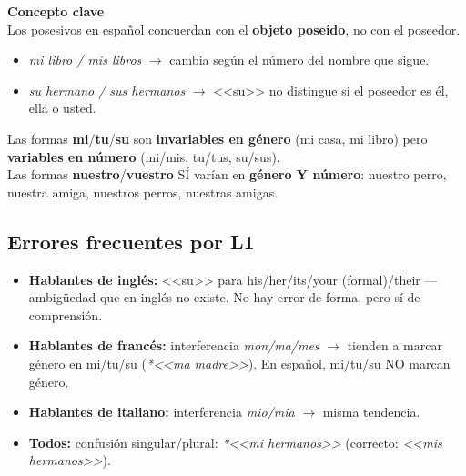 \documentclass[a4paper,10pt]{article}
\newcommand{\pos}[1]{\textbf{\textcolor{purpura}{#1}}}
\begin{document}
\begin{conceptbox}
\textbf{\textcolor{purpura}{\large Concepto clave}}\\[0.3cm]
Los posesivos en espa\~{n}ol concuerdan con el \textbf{objeto pose\'ido}, no con el poseedor.
\begin{itemize}[nosep, leftmargin=1.5em]
\item \textit{mi libro / mis libros} $\rightarrow$ cambia seg\'un el n\'umero del nombre que sigue.
\item \textit{su hermano / sus hermanos} $\rightarrow$ <<su>> no distingue si el poseedor es \'el, ella o usted.
\end{itemize}
\vspace{0.2cm}
Las formas \pos{mi}/\pos{tu}/\pos{su} son \textbf{invariables en g\'enero} (mi casa, mi libro) pero \textbf{variables en n\'umero} (mi/mis, tu/tus, su/sus).\\[0.2cm]
Las formas \pos{nuestro}/\pos{vuestro} S\'I var\'ian en \textbf{g\'enero Y n\'umero}: nuestro perro, nuestra amiga, nuestros perros, nuestras amigas.
\end{conceptbox}

\vspace{0.5cm}


\subsection*{\textcolor{purpura}{Errores frecuentes por L1}}

\begin{itemize}[leftmargin=1.5em]
\item \textbf{Hablantes de ingl\'es:} <<su>> para his/her/its/your (formal)/their --- ambig\"uedad que en ingl\'es no existe. No hay error de forma, pero s\'i de comprensi\'on.
\item \textbf{Hablantes de franc\'es:} interferencia \textit{mon/ma/mes} $\rightarrow$ tienden a marcar g\'enero en mi/tu/su (\textit{*<<ma madre>>}). En espa\~{n}ol, mi/tu/su NO marcan g\'enero.
\item \textbf{Hablantes de italiano:} interferencia \textit{mio/mia} $\rightarrow$ misma tendencia.
\item \textbf{Todos:} confusi\'on singular/plural: \textit{*<<mi hermanos>>} (correcto: \textit{<<mis hermanos>>}).
\end{itemize}

\vspace{0.3cm}
\end{document}
